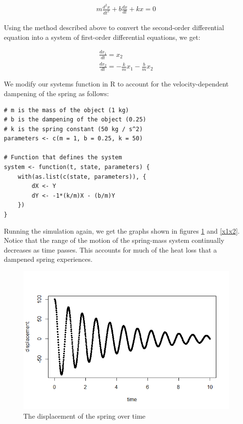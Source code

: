 \begin{gather*}
    m\frac{d^2 x}{dt^2}+b\frac{dx}{dt}+kx=0
\end{gather*}

Using the method described above to convert the second-order differential equation into a system of first-order differential equations, we get:

\begin{gather*}
\frac{dx_1}{dt}=x_2\\
\frac{dx_2}{dt}=-\frac{k}{m}x_1 - \frac{b}{m}x_2
\end{gather*}

We modify our systems function in R to account for the velocity-dependent dampening of the spring as follows:

\begin{lstlisting}
# m is the mass of the object (1 kg)
# b is the dampening of the object (0.25)
# k is the spring constant (50 kg / s^2)
parameters <- c(m = 1, b = 0.25, k = 50)

# Function that defines the system
system <- function(t, state, parameters) {
    with(as.list(c(state, parameters)), {
        dX <- Y
        dY <- -1*(k/m)X - (b/m)Y
    })
}
\end{lstlisting}

Running the simulation again, we get the graphs shown in figures \ref{displacementtime} and \ref{x1x2}.
Notice that the range of the motion of the spring-mass system continually decreases as time passes.
This accounts for much of the heat loss that a dampened spring experiences. 

\begin{figure}[htbp!]
    \centering
    \includegraphics[width=12cm]{pictures/diffeq/plot3.png}
    \caption{The displacement of the spring over time}
    \label{displacementtime}
\end{figure}

